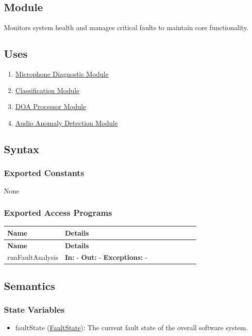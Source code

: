 \documentclass[12pt, titlepage]{article}
\newenvironment{apitable}{%
\begin{center}
\begin{longtable}{|p{0.3\linewidth}|p{0.7\linewidth}|} 
\hline
\textbf{Name} & \textbf{Details} \\
\hline
\endfirsthead
\hline
\textbf{Name} & \textbf{Details} \\
\hline
\endhead
\hline
\endfoot
\hline
\endlastfoot
}{%
\end{longtable}
\end{center}
}
\newcommand{\apifunc}[4]{%
#1 & 
\textbf{In:} #2 \newline
\textbf{Out:} #3 \newline
\textbf{Exceptions:} #4 \\
\hline
}
\begin{document}
\subsection{Module}

Monitors system health and manages critical faults to maintain core
functionality.

\subsection{Uses}

\begin{enumerate}
  \item \hyperref[mod:MicDiag]{Microphone Diagnostic Module}
  \item \hyperref[mod:Classification]{Classification Module}
  \item \hyperref[mod:DOA]{DOA Processor Module}
  \item \hyperref[mod:AudioAnomaly]{Audio Anomaly Detection Module}
\end{enumerate}

\subsection{Syntax}

\subsubsection{Exported Constants}

None

\subsubsection{Exported Access Programs}
\begin{apitable}
  \apifunc{runFaultAnalysis}{-}{-}{-}
\end{apitable}

\subsection{Semantics}

\subsubsection{State Variables}

\begin{itemize}
  \item faultState (\hyperref[enum:FaultState]{FaultState}):
    \label{faultState}
    The current fault state of the overall software system.
\end{itemize}
\end{document}
